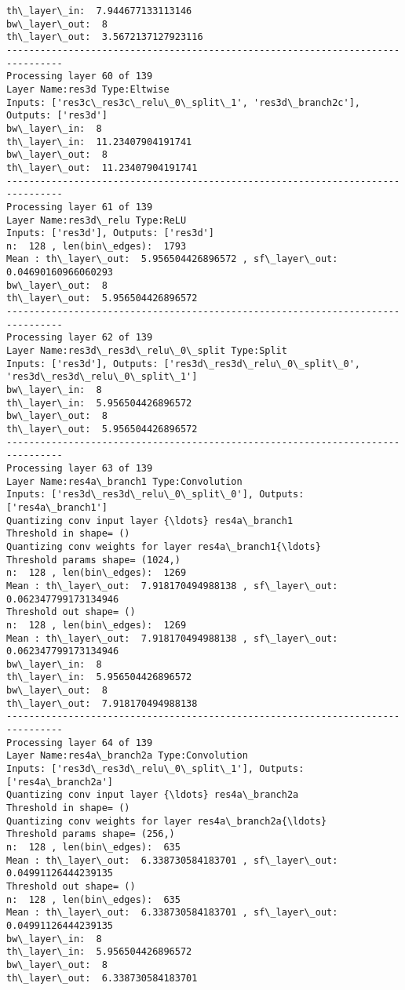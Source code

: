 \documentclass[11pt]{article}
\begin{document}
\begin{Verbatim}[commandchars=\\\{\}]
th\_layer\_in:  7.944677133113146
bw\_layer\_out:  8
th\_layer\_out:  3.5672137127923116
--------------------------------------------------------------------------------
Processing layer 60 of 139
Layer Name:res3d Type:Eltwise
Inputs: ['res3c\_res3c\_relu\_0\_split\_1', 'res3d\_branch2c'], Outputs: ['res3d']
bw\_layer\_in:  8
th\_layer\_in:  11.23407904191741
bw\_layer\_out:  8
th\_layer\_out:  11.23407904191741
--------------------------------------------------------------------------------
Processing layer 61 of 139
Layer Name:res3d\_relu Type:ReLU
Inputs: ['res3d'], Outputs: ['res3d']
n:  128 , len(bin\_edges):  1793
Mean : th\_layer\_out:  5.956504426896572 , sf\_layer\_out:  0.04690160966060293
bw\_layer\_out:  8
th\_layer\_out:  5.956504426896572
--------------------------------------------------------------------------------
Processing layer 62 of 139
Layer Name:res3d\_res3d\_relu\_0\_split Type:Split
Inputs: ['res3d'], Outputs: ['res3d\_res3d\_relu\_0\_split\_0', 'res3d\_res3d\_relu\_0\_split\_1']
bw\_layer\_in:  8
th\_layer\_in:  5.956504426896572
bw\_layer\_out:  8
th\_layer\_out:  5.956504426896572
--------------------------------------------------------------------------------
Processing layer 63 of 139
Layer Name:res4a\_branch1 Type:Convolution
Inputs: ['res3d\_res3d\_relu\_0\_split\_0'], Outputs: ['res4a\_branch1']
Quantizing conv input layer {\ldots} res4a\_branch1
Threshold in shape= ()
Quantizing conv weights for layer res4a\_branch1{\ldots}
Threshold params shape= (1024,)
n:  128 , len(bin\_edges):  1269
Mean : th\_layer\_out:  7.918170494988138 , sf\_layer\_out:  0.062347799173134946
Threshold out shape= ()
n:  128 , len(bin\_edges):  1269
Mean : th\_layer\_out:  7.918170494988138 , sf\_layer\_out:  0.062347799173134946
bw\_layer\_in:  8
th\_layer\_in:  5.956504426896572
bw\_layer\_out:  8
th\_layer\_out:  7.918170494988138
--------------------------------------------------------------------------------
Processing layer 64 of 139
Layer Name:res4a\_branch2a Type:Convolution
Inputs: ['res3d\_res3d\_relu\_0\_split\_1'], Outputs: ['res4a\_branch2a']
Quantizing conv input layer {\ldots} res4a\_branch2a
Threshold in shape= ()
Quantizing conv weights for layer res4a\_branch2a{\ldots}
Threshold params shape= (256,)
n:  128 , len(bin\_edges):  635
Mean : th\_layer\_out:  6.338730584183701 , sf\_layer\_out:  0.04991126444239135
Threshold out shape= ()
n:  128 , len(bin\_edges):  635
Mean : th\_layer\_out:  6.338730584183701 , sf\_layer\_out:  0.04991126444239135
bw\_layer\_in:  8
th\_layer\_in:  5.956504426896572
bw\_layer\_out:  8
th\_layer\_out:  6.338730584183701

\end{Verbatim}
\end{document}
